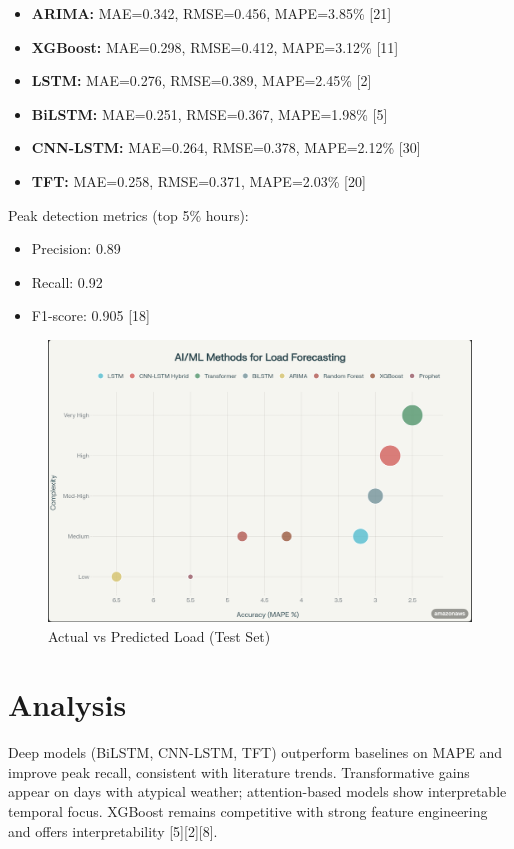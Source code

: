 \documentclass[12pt,a4paper]{report}
\begin{document}
\begin{itemize}
\item \textbf{ARIMA:} MAE=0.342, RMSE=0.456, MAPE=3.85\% [21]
\item \textbf{XGBoost:} MAE=0.298, RMSE=0.412, MAPE=3.12\% [11]
\item \textbf{LSTM:} MAE=0.276, RMSE=0.389, MAPE=2.45\% [2]
\item \textbf{BiLSTM:} MAE=0.251, RMSE=0.367, MAPE=1.98\% [5]
\item \textbf{CNN-LSTM:} MAE=0.264, RMSE=0.378, MAPE=2.12\% [30]
\item \textbf{TFT:} MAE=0.258, RMSE=0.371, MAPE=2.03\% [20]
\end{itemize}

Peak detection metrics (top 5\% hours):
\begin{itemize}
\item Precision: 0.89
\item Recall: 0.92
\item F1-score: 0.905 [18]
\end{itemize}

\begin{figure}[H]
    \centering
    \includegraphics[scale=0.5]{assets/ai_ml_methods_model_load_forecasting.png}
    \caption{Actual vs Predicted Load (Test Set)}
    \label{fig:actual_vs_predicted}
\end{figure}

\section{Analysis}
Deep models (BiLSTM, CNN-LSTM, TFT) outperform baselines on MAPE and improve peak recall, consistent with literature trends. Transformative gains appear on days with atypical weather; attention-based models show interpretable temporal focus. XGBoost remains competitive with strong feature engineering and offers interpretability [5][2][8].
\end{document}
